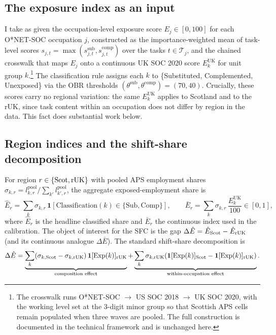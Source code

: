 \subsection{The exposure index as an input}

I take as given the occupation-level exposure score $E_j\in[0,100]$ for each O*NET-SOC occupation $j$, constructed as the importance-weighted mean of task-level scores $s_{j,t}=\max(s^{\mathrm{sub}}_{j,t},s^{\mathrm{comp}}_{j,t})$ over the tasks $t\in\mathcal{T}_j$, and the chained crosswalk that maps $E_j$ onto a continuous UK SOC 2020 score $E^{\mathrm{UK}}_k$ for unit group $k$.\footnote{The crosswalk runs O*NET-SOC $\to$ US SOC 2018 $\to$ UK SOC 2020, with the working level set at the 3-digit minor group so that Scottish APS cells remain populated when three waves are pooled. The full construction is documented in the technical framework and is unchanged here.} The classification rule assigns each $k$ to \{Substituted, Complemented, Unexposed\} via the OBR thresholds \citep{obr2025} $(\theta^{\mathrm{sub}},\theta^{\mathrm{comp}})=(70,40)$. Crucially, these scores carry no regional variation: the same $E^{\mathrm{UK}}_k$ applies to Scotland and to the rUK, since task content within an occupation does not differ by region in the data. This fact does substantial work below.

\subsection{Region indices and the shift-share decomposition}

For region $r\in\{\mathrm{Scot},\mathrm{rUK}\}$ with pooled APS employment shares $\sigma_{k,r}=l^{\mathrm{pool}}_{k,r}/\sum_{k'}l^{\mathrm{pool}}_{k',r}$, the aggregate exposed-employment share is
\begin{equation}
\hat{E}_r=\sum_k \sigma_{k,r}\,\mathbf{1}\!\left[\mathrm{Classification}(k)\in\{\mathrm{Sub},\mathrm{Comp}\}\right],
\qquad
\bar{E}_r=\sum_k \sigma_{k,r}\,\frac{E^{\mathrm{UK}}_k}{100}\in[0,1],
\label{eq:index}
\end{equation}
where $\hat E_r$ is the headline classified share and $\bar E_r$ the continuous index used in the calibration. The object of interest for the SFC is the gap $\Delta\hat E=\hat E_{\mathrm{Scot}}-\hat E_{\mathrm{rUK}}$ (and its continuous analogue $\Delta\bar E$). The standard shift-share decomposition is
\begin{equation}
\Delta\hat E
=\underbrace{\sum_k\!\left(\sigma_{k,\mathrm{Scot}}-\sigma_{k,\mathrm{rUK}}\right)\mathbf{1}[\mathrm{Exp}(k)]_{\mathrm{rUK}}}_{\text{composition effect}}
+\underbrace{\sum_k \sigma_{k,\mathrm{rUK}}\!\left(\mathbf{1}[\mathrm{Exp}(k)]_{\mathrm{Scot}}-\mathbf{1}[\mathrm{Exp}(k)]_{\mathrm{rUK}}\right)}_{\text{within-occupation effect}}.
\label{eq:shiftshare}
\end{equation}

